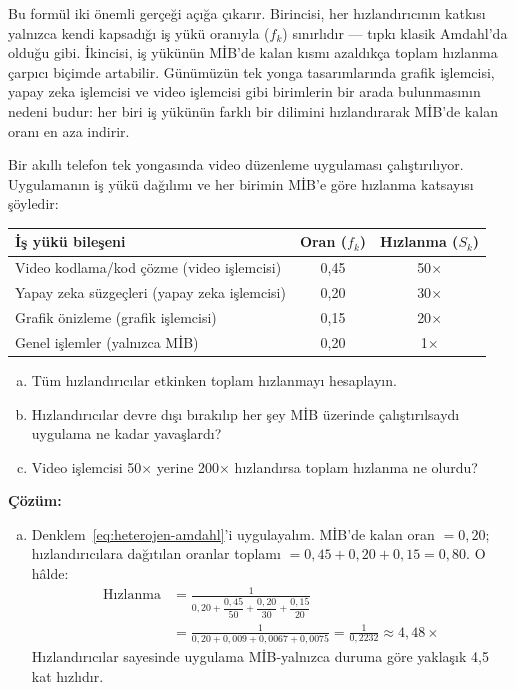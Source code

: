 Bu formül iki önemli gerçeği açığa çıkarır. Birincisi, her hızlandırıcının katkısı yalnızca kendi kapsadığı iş yükü oranıyla ($f_k$) sınırlıdır --- tıpkı klasik Amdahl'da olduğu gibi. İkincisi, iş yükünün MİB'de kalan kısmı azaldıkça toplam hızlanma çarpıcı biçimde artabilir. Günümüzün tek yonga tasarımlarında grafik işlemcisi, yapay zeka işlemcisi ve video işlemcisi gibi birimlerin bir arada bulunmasının nedeni budur: her biri iş yükünün farklı bir dilimini hızlandırarak MİB'de kalan oranı en aza indirir.

\begin{ornek}[2.12]
Bir akıllı telefon tek yongasında video düzenleme uygulaması çalıştırılıyor. Uygulamanın iş yükü dağılımı ve her birimin MİB'e göre hızlanma katsayısı şöyledir:

\begin{center}
\small
\begin{tabular}{lcc}
\toprule
\textbf{İş yükü bileşeni} & \textbf{Oran ($f_k$)} & \textbf{Hızlanma ($S_k$)} \\
\midrule
Video kodlama/kod çözme (video işlemcisi) & 0,45 & 50$\times$ \\
Yapay zeka süzgeçleri (yapay zeka işlemcisi) & 0,20 & 30$\times$ \\
Grafik önizleme (grafik işlemcisi)          & 0,15 & 20$\times$ \\
Genel işlemler (yalnızca MİB)          & 0,20 & 1$\times$ \\
\bottomrule
\end{tabular}
\end{center}

\begin{enumerate}[(a)]
    \item Tüm hızlandırıcılar etkinken toplam hızlanmayı hesaplayın.
    \item Hızlandırıcılar devre dışı bırakılıp her şey MİB üzerinde çalıştırılsaydı uygulama ne kadar yavaşlardı?
    \item Video işlemcisi 50$\times$ yerine 200$\times$ hızlandırsa toplam hızlanma ne olurdu?
\end{enumerate}

\textbf{Çözüm:}
\begin{enumerate}[(a)]
    \item Denklem~\ref{eq:heterojen-amdahl}'i uygulayalım. MİB'de kalan oran $= 0{,}20$; hızlandırıcılara dağıtılan oranlar toplamı $= 0{,}45 + 0{,}20 + 0{,}15 = 0{,}80$. O hâlde:
    \begin{align*}
    \text{Hızlanma} &= \frac{1}{0{,}20 + \dfrac{0{,}45}{50} + \dfrac{0{,}20}{30} + \dfrac{0{,}15}{20}} \\[6pt]
    &= \frac{1}{0{,}20 + 0{,}009 + 0{,}0067 + 0{,}0075}
    = \frac{1}{0{,}2232}
    \approx 4{,}48\times
    \end{align*}
    Hızlandırıcılar sayesinde uygulama MİB-yalnızca duruma göre yaklaşık 4,5 kat hızlıdır.


\end{enumerate}
\end{ornek}
